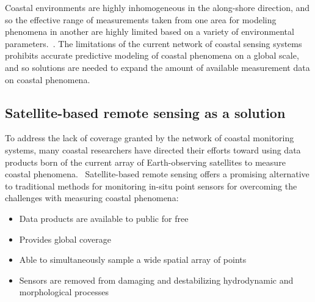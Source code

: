 \documentclass[12pt]{article}
\begin{document}
Coastal environments are highly inhomogeneous in the along-shore direction, and so the effective range of measurements taken from one area for modeling phenomena in another are highly limited based on a variety of environmental parameters.~\cite{Holman2013}. The limitations of the current network of coastal sensing systems prohibits accurate predictive modeling of coastal phenomena on a global scale, and so solutions are needed to expand the amount of available measurement data on coastal phenomena.

\subsection{Satellite-based remote sensing as a solution}
To address the lack of coverage granted by the network of coastal monitoring systems, many coastal researchers have directed their efforts toward using data products born of the current array of Earth-observing satellites to measure coastal phenomena.~\cite{Vitousek2023, Holman2013} Satellite-based remote sensing offers a promising alternative to traditional methods for monitoring in-situ point sensors for overcoming the challenges with measuring coastal phenomena:

{\small
\begin{itemize}
    \item Data products are available to public for free
    \item Provides global coverage
    \item Able to simultaneously sample a wide spatial array of points
    \item Sensors are removed from damaging and destabilizing hydrodynamic and morphological processes
\end{itemize}
}
~\cite{Vitousek2023, Holman2013}
\end{document}
